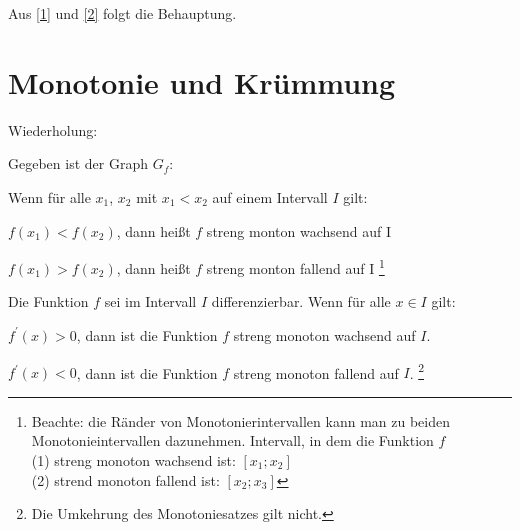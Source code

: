 Aus \eqref{1} und \eqref{2} folgt die Behauptung.

\section{Monotonie und Krümmung}
Wiederholung:

Gegeben ist der Graph $G_f$:

\begin{definition}
    Wenn für alle $x_1$, $x_2$ mit $x_1 < x_2$ auf einem Intervall $I$ gilt:
    
    $f(x_1) < f(x_2)$, dann heißt $f$ streng monton wachsend auf I

    $f(x_1) > f(x_2)$, dann heißt $f$ streng monton fallend auf I \footnote{Beachte: die Ränder von Monotonierintervallen kann man zu beiden Monotonieintervallen dazunehmen. Intervall, in dem die Funktion $f$ \\ (1) streng monoton wachsend ist: $[x_1;x_2]$ \\(2) strend monoton fallend ist: $[x_2;x_3]$} \\
\end{definition}
\begin{satz}[Monotoniesatz]
    Die Funktion $f$ sei im Intervall $I$ differenzierbar. Wenn für alle $x \in I$ gilt:

    $f^\prime(x) > 0$, dann ist die Funktion $f$ streng monoton wachsend auf $I$. 
    
    $f^\prime(x) < 0$, dann ist die Funktion $f$ streng monoton fallend auf $I$. \footnote{Die Umkehrung des Monotoniesatzes gilt nicht.} \\
\end{satz}

